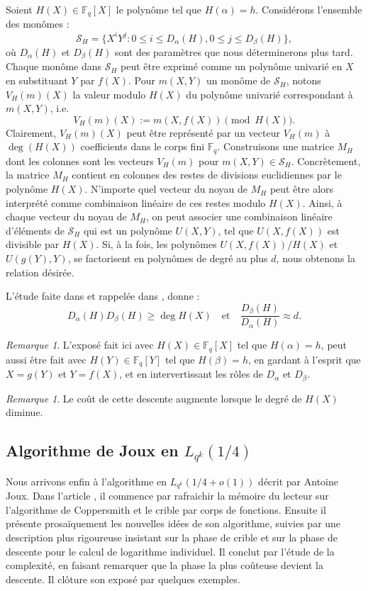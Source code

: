 \documentclass[a4paper, titlepage, 11pt]{article}
\theoremstyle{definition}
\theoremstyle{remark}
\newtheorem{rema}[theo]{Remarque}
\def\o{o}
\def\gf #1{\mathbb{F}_{#1}}
\begin{document}
Soient $H(X)\in\gf{q}[X]$ le polynôme tel que $H(\alpha) = h$. Considérons l'ensemble des monômes :
$$\mathcal S_H = \{X^iY^j : 0 \leqslant i \leqslant D_\alpha(H), 0 \leqslant j \leqslant D_\beta(H)\},$$
où $D_\alpha(H)$ et $D_\beta(H)$ sont des paramètres que nous déterminerons plus tard. Chaque monôme dans $\mathcal S_H$ peut être exprimé comme un polynôme univarié en $X$ en substituant $Y$ par $f(X)$. Pour $m(X,Y)$ un monôme de $\mathcal S_H$, notons $V_H(m)(X)$ la valeur modulo $H(X)$ du polynôme univarié correspondant à $m(X,Y)$, i.e. 
$$V_H(m)(X) := m(X,f(X)) \pmod{H(X)}.$$
Clairement, $V_H(m)(X)$ peut être représenté par un vecteur $V_H(m)$ à $\deg(H(X))$ coefficients dans le corps fini $\gf{q}$. Construisons une matrice $M_H$ dont les colonnes sont les vecteurs $V_H(m)$ pour $m(X,Y) \in \mathcal S_H$. Concrètement, la matrice $M_H$ contient en colonnes des restes de divisions euclidiennes par le polynôme $H(X)$. N'importe quel vecteur du noyau de $M_H$ peut être alors interprété comme combinaison linéaire de ces restes modulo $H(X)$. Ainsi, à chaque vecteur du noyau de $M_H$, on peut associer une combinaison linéaire d'éléments de $\mathcal S_H$ qui est un polynôme $U(X,Y)$, tel que $U(X,f(X))$ est divisible par $H(X)$. Si, à la fois, les polynômes $U(X,f(X))/H(X)$ et $U(g(Y),Y)$, se factorisent en polynômes de degré au plus $d$, nous obtenons la relation désirée.

L'étude faite dans \cite{joux2006, joux2002} et rappelée dans \cite{joux2013}, donne :
$$D_\alpha(H) D_\beta(H) \geqslant \deg H(X) \quad\text{et}\quad \frac{D_\beta(H)}{D_\alpha(H)} \approx d.$$

\begin{rema}
L'exposé fait ici avec $H(X)\in\gf{q}[X]$ tel que $H(\alpha) = h$, peut aussi être fait avec $H(Y)\in\gf{q}[Y]$ tel que $H(\beta) = h$, en gardant à l'esprit que $X = g(Y)$ et $Y = f(X)$, et en intervertissant les rôles de $D_\alpha$ et $D_\beta$.
\end{rema}
\begin{rema}
Le coût de cette descente augmente lorsque le degré de $H(X)$ diminue.
\end{rema}

\subsection{Algorithme de Joux en $L_{q^k}(1/4)$}

Nous arrivons enfin à l'algorithme en $L_{q^k}(1/4 + \o(1))$ décrit par Antoine Joux. Dans l'article \cite{joux2013}, il commence par rafraichir la mémoire du lecteur sur l'algorithme de Coppersmith et le crible par corps de fonctions. Ensuite il présente prosaïquement les nouvelles idées de son algorithme, suivies par une description plus rigoureuse insistant sur la phase de crible et sur la phase de descente pour le calcul de logarithme individuel. Il conclut par l'étude de la complexité, en faisant remarquer que la phase la plus coûteuse devient la descente. Il clôture son exposé par quelques exemples.
\end{document}
